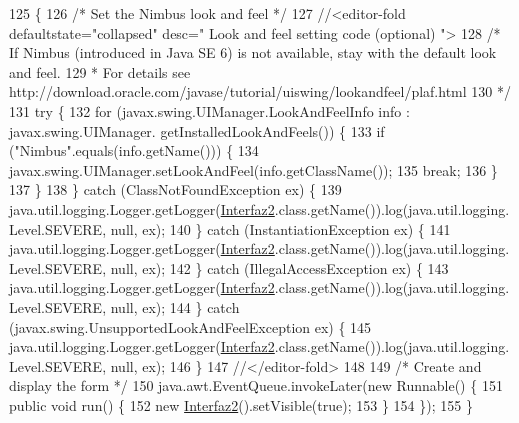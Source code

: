 \begin{DoxyCode}
125                                            \{
126         \textcolor{comment}{/* Set the Nimbus look and feel */}
127         \textcolor{comment}{//<editor-fold defaultstate="collapsed" desc=" Look and feel setting code (optional) ">}
128         \textcolor{comment}{/* If Nimbus (introduced in Java SE 6) is not available, stay with the default look and feel.}
129 \textcolor{comment}{         * For details see http://download.oracle.com/javase/tutorial/uiswing/lookandfeel/plaf.html }
130 \textcolor{comment}{         */}
131         \textcolor{keywordflow}{try} \{
132             \textcolor{keywordflow}{for} (javax.swing.UIManager.LookAndFeelInfo info : javax.swing.UIManager.
      getInstalledLookAndFeels()) \{
133                 \textcolor{keywordflow}{if} (\textcolor{stringliteral}{"Nimbus"}.equals(info.getName())) \{
134                     javax.swing.UIManager.setLookAndFeel(info.getClassName());
135                     \textcolor{keywordflow}{break};
136                 \}
137             \}
138         \} \textcolor{keywordflow}{catch} (ClassNotFoundException ex) \{
139             java.util.logging.Logger.getLogger(\mbox{\hyperlink{classejercicio2_1_1_interfaz2_a81dcd7ee80d8193ffc7e1775f4a598d7}{Interfaz2}}.class.getName()).log(java.util.logging.
      Level.SEVERE, null, ex);
140         \} \textcolor{keywordflow}{catch} (InstantiationException ex) \{
141             java.util.logging.Logger.getLogger(\mbox{\hyperlink{classejercicio2_1_1_interfaz2_a81dcd7ee80d8193ffc7e1775f4a598d7}{Interfaz2}}.class.getName()).log(java.util.logging.
      Level.SEVERE, null, ex);
142         \} \textcolor{keywordflow}{catch} (IllegalAccessException ex) \{
143             java.util.logging.Logger.getLogger(\mbox{\hyperlink{classejercicio2_1_1_interfaz2_a81dcd7ee80d8193ffc7e1775f4a598d7}{Interfaz2}}.class.getName()).log(java.util.logging.
      Level.SEVERE, null, ex);
144         \} \textcolor{keywordflow}{catch} (javax.swing.UnsupportedLookAndFeelException ex) \{
145             java.util.logging.Logger.getLogger(\mbox{\hyperlink{classejercicio2_1_1_interfaz2_a81dcd7ee80d8193ffc7e1775f4a598d7}{Interfaz2}}.class.getName()).log(java.util.logging.
      Level.SEVERE, null, ex);
146         \}
147         \textcolor{comment}{//</editor-fold>}
148 
149         \textcolor{comment}{/* Create and display the form */}
150         java.awt.EventQueue.invokeLater(\textcolor{keyword}{new} Runnable() \{
151             \textcolor{keyword}{public} \textcolor{keywordtype}{void} run() \{
152                 \textcolor{keyword}{new} \mbox{\hyperlink{classejercicio2_1_1_interfaz2_a81dcd7ee80d8193ffc7e1775f4a598d7}{Interfaz2}}().setVisible(\textcolor{keyword}{true});
153             \}
154         \});
155     \}
\end{DoxyCode}


